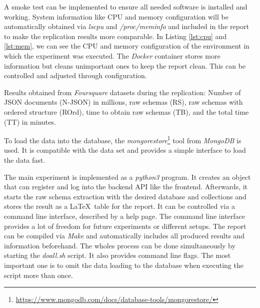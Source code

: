 \documentclass[sigconf, nonacm]{acmart}
\begin{document}


A smoke test can be implemented to ensure all needed software is installed and working.
System information like CPU and memory configuration will be automatically obtained via \textit{lscpu} and \textit{/proc/meminfo} and included in the report to make the replication results more comparable. In Listing \ref{lst:cpu} and \ref{lst:mem}, we can see the CPU and memory configuration of the environment in which the experiment was executed. The \textit{Docker} container stores more information but cleans unimportant ones to keep the report clean. This can be controlled and adjusted through configuration. 



\begin{table}[ht]
  \caption{Results obtained from \textit{Foursquare} datasets during the replication: Number of JSON documents (N-JSON) in millions, raw schemas (RS), raw schemas with ordered structure (ROrd), time to obtain raw schemas (TB), and the total time (TT) in minutes.}
  \label{tab:foursquare_results}
  
\end{table}

\noindent To load the data into the database, the \textit{mongorestore}\footnote{\url{https://www.mongodb.com/docs/database-tools/mongorestore/}} tool from \textit{MongoDB} is used. It is compatible with the data set and provides a simple interface to load the data fast.

\noindent The main experiment is implemented as a \textit{python3} program. It creates an object that can register and log into the backend API like the frontend. Afterwards, it starts the raw schema extraction with the desired database and collections and stores the result as a \LaTeX~table for the report. It can be controlled via a command line interface, described by a help page. The command line interface provides a lot of freedom for future experiments or different setups. The report can be compiled via \textit{Make} and automatically includes all produced results and information beforehand. The wholes process can be done simultaneously by starting the \textit{doall.sh} script. It also provides command line flags. The most important one is to omit the data loading to the database when executing the script more than once.
\end{document}
